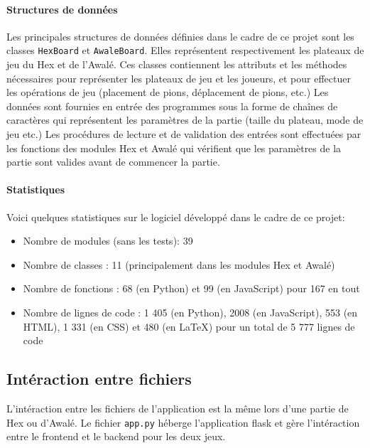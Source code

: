 \paragraph{Structures de données}
Les principales structures de données définies dans le cadre de ce projet sont les classes
\texttt{HexBoard} et \texttt{AwaleBoard}. Elles représentent respectivement les plateaux de jeu du Hex et de
l'Awalé. Ces classes contiennent les attributs et les méthodes nécessaires
pour représenter les plateaux de jeu et les joueurs, et pour effectuer les opérations de jeu
(placement de pions, déplacement de pions, etc.) Les données sont fournies en entrée des programmes
sous la forme de chaînes de caractères qui représentent les paramètres de la partie (taille du
plateau, mode de jeu etc.) Les procédures de lecture et de validation
des entrées sont effectuées par les fonctions des modules Hex et Awalé qui vérifient que les
paramètres de la partie sont valides avant de commencer la partie.

\paragraph{Statistiques}
Voici quelques statistiques sur le logiciel développé dans le cadre de ce projet:
\begin{itemize}
    \item Nombre de modules (sans les tests): 39
    \item Nombre de classes : 11 (principalement dans les modules Hex et Awalé)
    \item Nombre de fonctions : 68 (en Python) et 99 (en JavaScript) pour 167 en tout
    \item Nombre de lignes de code : 1 405 (en Python), 2008 (en JavaScript), 553 (en HTML), 1 331 (en CSS)
    et 480 (en \LaTeX) pour un total de 5 777 lignes de code
\end{itemize}

\subsection{Intéraction entre fichiers}
L'intéraction entre les fichiers de l'application est la même lors d'une partie de Hex ou 
d'Awalé. Le fichier \texttt{app.py} héberge l'application flask et gère l'intéraction entre le frontend et le 
backend pour les deux jeux.

